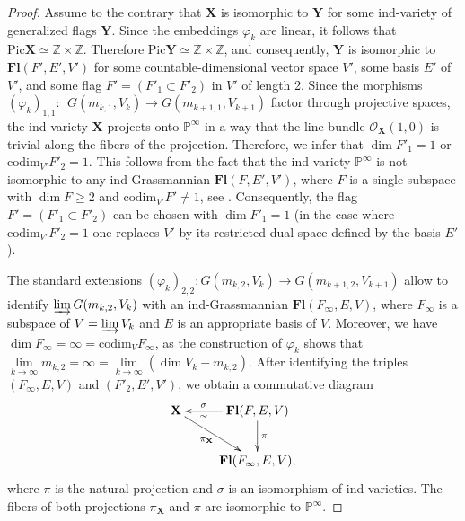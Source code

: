 \documentclass[12pt]{amsart}
\renewcommand{\phi}{\varphi}
\theoremstyle{definition}
\begin{document}
\begin{proof}
Assume to the contrary that $\mathbf{X}$ is isomorphic to 
$\mathbf{Y}$ for some ind-variety of generalized flags 
$\mathbf{Y}$. Since the embeddings $\phi_k$ are linear, it 
follows that $\mathrm{Pic}\mathbf{X}\simeq\mathbb{Z}\times
\mathbb{Z}$. Therefore $\mathrm{Pic}\mathbf{Y}\simeq\mathbb{Z}
\times\mathbb{Z}$, and consequently, $\mathbf{Y}$ is 
isomorphic to $\mathbf{Fl}(F',E',V')$ for some
countable-dimensional vector space $V'$, some basis $E'$ of 
$V'$, and some flag $F'=(F'_1\subset F'_2)$ in $V'$ of length 
2. Since the 
morphisms $(\phi_k)_{1,1}:\ \ G(m_{k,1},V_k)\to G(m_{k+1,1},
V_{k+1})$ factor through projective spaces, the ind-variety 
$\mathbf{X}$ projects onto $\mathbb{P}^{\infty}$ in a way that 
the line bundle $\mathcal{O}_{\mathbf{X}}(1,0)$ is trivial 
along the fibers of the projection. Therefore, we infer that
$\dim F'_1=1$ or $\mathrm{codim}_{V'}F'_2=1$. This follows 
from the fact that the ind-variety $\mathbb{P}^{\infty}$ is not
isomorphic to any ind-Grassmannian $\mathbf{Fl}(F,E',V')$, 
where $F$ is a single subspace with $\dim F\ge2$ and 
$\mathrm{codim}_{V'}F'\ne1$, see \cite[Thm. 2]{PT}. 
Consequently, the flag $F'=(F'_1\subset F'_2)$ can be chosen 
with $\dim F'_1=1$ (in the case where $\mathrm{codim}_{V'}F'_2
=1$ one replaces $V'$ by its restricted dual space defined by 
the basis $E'$). 

The standard extensions $(\phi_k)_{2,2}:G(m_{k,2},V_k)\to G(
m_{k+1,2},V_{k+1})$ allow to identify $\varinjlim G(m_{k,2},V
_k)$ with an ind-Grassmannian $\mathbf{Fl}(F_{\infty},E,V)$, 
where $F_{\infty}$ is a subspace of $V=\varinjlim V_k$ and $E$ 
is an appropriate basis of $V$. Moreover, we have $\dim 
F_{\infty}=\infty=\mathrm{codim}_{V}F_{\infty}$, as the 
construction of $\phi_k$ shows that $\lim\limits_{k\to\infty}
m_{k,2}=\infty=\lim\limits_{k\to\infty}(\dim V_k-m_{k,2})$. 
After identifying the triples $(F_{\infty},E,V)$ and $(F'_2,E',
V')$, we obtain a commutative diagram
$$
\xymatrix{
\mathbf{X}\ar[dr]_-{\pi_{\mathbf{X}}}& 
\mathbf{Fl}(F,E,V)\ar[d]^-{\pi}\ar[l]^-{\sim}_-{\sigma}\\
& \mathbf{Fl}({F_{\infty}},E,V),} 
$$
where $\pi$ is the natural projection and $\sigma$ is an 
isomorphism of ind-varieties. The fibers of both projections 
$\pi_{\mathbf{X}}$ and $\pi$ are isomorphic to $\mathbb{P}
^{\infty}$.


\end{proof}
\end{document}
